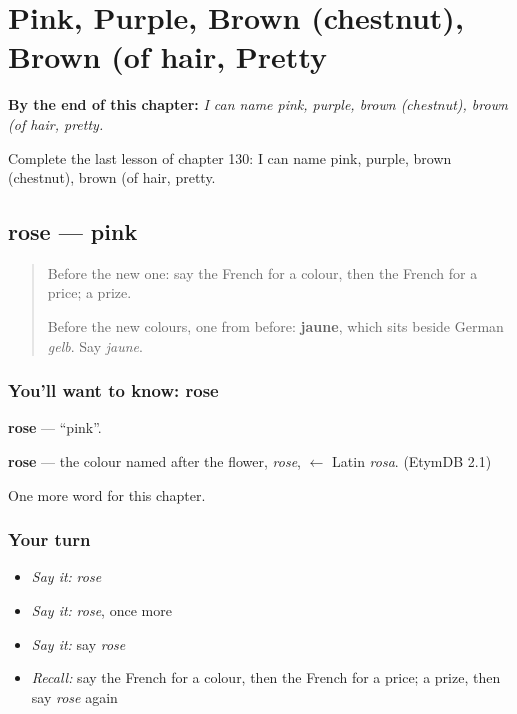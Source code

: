 
\chapter{Pink, Purple, Brown (chestnut), Brown (of hair, Pretty}
\label{ch:fr-pink-purple-brown-chestnut-brown-of-hair-pretty}

\begin{chapteropening}
\textbf{By the end of this chapter:} \emph{I can name pink, purple, brown (chestnut), brown (of hair, pretty.}

Complete the last lesson of chapter 130: I can name pink, purple, brown (chestnut), brown (of hair, pretty.
\end{chapteropening}

\section[rose]{rose — pink}

\label{lesson:FR-C130-rose}



\begin{quote}
Before the new one: say the French for a colour, then the French for a price; a prize.

Before the new colours, one from before: \textbf{jaune}, which sits beside German \emph{gelb}. Say \emph{jaune}.
\end{quote}

\subsection*{You'll want to know: rose}
\textbf{rose} — \textquotedblleft{}pink\textquotedblright{}.

\begin{cousinweb}
\textbf{rose} — the colour named after the flower, \emph{rose}, $\leftarrow$ Latin \emph{rosa}. (EtymDB 2.1)
\end{cousinweb}

\begin{grammarlens}[title={What you've built}]
One more word for this chapter.
\end{grammarlens}

\subsection*{Your turn}
\begin{itemize}
\raggedright
  \item \emph{Say it:} \emph{rose}
  \item \emph{Say it:} \emph{rose}, once more
  \item \emph{Say it:} say \emph{rose}
  \item \emph{Recall:} say the French for a colour, then the French for a price; a prize, then say \emph{rose} again
\end{itemize}

